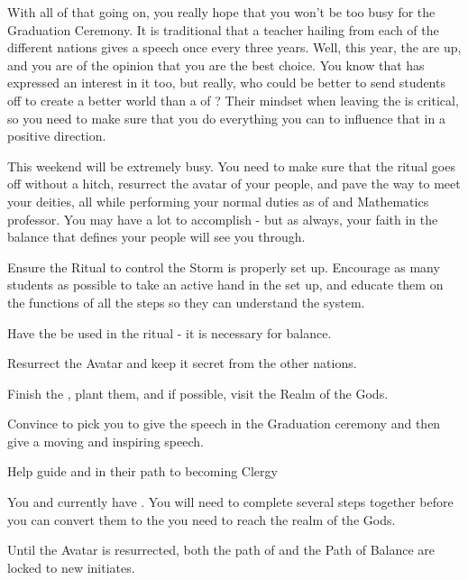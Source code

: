 \documentclass[char]{GL2020}
\begin{document}
With all of that going on, you really hope that you won’t be too busy for the Graduation Ceremony. It is traditional that a teacher hailing from each of the different nations gives a speech once every three years. Well, this year, the \pShip{} are up, and you are of the opinion that you are the best choice. You know that \cPirate{} has expressed an interest in it too, but really, who could be better to send students off to create a better world than a \cFlowPriest{\cleric} of \cFlow{\full}? Their mindset when leaving the \pSc{} is critical, so you need to make sure that you do everything you can to influence that in a positive direction.

This weekend will be extremely busy. You need to make sure that the ritual goes off without a hitch, resurrect the avatar of your people, and pave the way to meet your deities, all while performing your normal duties as \cFlowPriest{\cleric} of \cFlow{} and Mathematics professor. You may have a lot to accomplish - but as always, your faith in the balance that defines your people will see you through. 


\begin{itemz}[Goals]
	\item Ensure the Ritual to control the Storm is properly set up. Encourage as many students as possible to take an active hand in the set up, and educate them on the functions of all the steps so they can understand the system.
	\item Have the \iNet{} be used in the ritual - it is necessary for balance.
	\item Resurrect the \cEbb{} Avatar and keep it secret from the other nations.
	\item Finish the \iBeansMB{}, plant them, and if possible, visit the Realm of the Gods.
\item Convince \cMusic{} to pick you to give the speech in the Graduation ceremony and then give a moving and inspiring speech.
\item Help guide \cInitiate{} and \cWarlordDaughter{} in their path to becoming Clergy
\end{itemz}

\begin{itemz}[Notes]
	\item You and \cCurse{} currently have \iBeansNB{}. You will need to complete several steps together before you can convert them to the \iBeansMB{} you need to reach the realm of the Gods.
	\item Until the \cEbb{} Avatar is resurrected, both the path of \cEbb{} and the Path of Balance are locked to new initiates.
\end{itemz}
\end{document}
